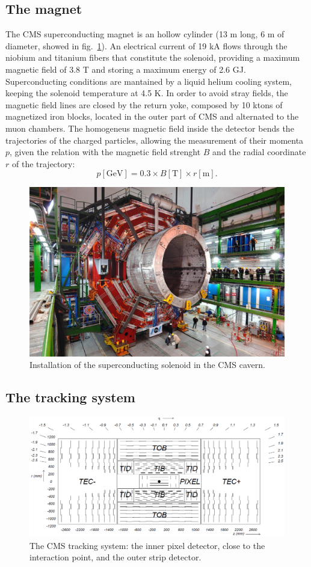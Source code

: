 \subsection{The magnet}
The CMS superconducting magnet is an hollow cylinder (13 m long, 6 m of diameter, showed in fig.~\ref{fig:CMS_solenoid}). An electrical current of 19 kA flows through the niobium and titanium fibers that constitute the solenoid, providing a maximum magnetic field of 3.8 T and storing a maximum energy of 2.6 GJ. Superconducting conditions are mantained by a liquid helium cooling system, keeping the solenoid temperature at 4.5 K. In order to avoid stray fields, the magnetic field lines are closed by the return yoke, composed by 10 ktons of magnetized iron blocks, located in the outer part of CMS and alternated to the muon chambers. The homogeneus magnetic field inside the detector bends the trajectories of the charged particles, allowing the measurement of their momenta $p$, given the relation with the magnetic field strenght $B$ and the radial coordinate $r$ of the trajectory:
\begin{equation}
p [\text{GeV}] = 0.3 \times B [\text{T}] \times r [\text{m}]. 
\end{equation}

\begin{figure}[!htb]
  \centering
    \includegraphics[width=.5\textwidth]{figures/CMS_solenoid.jpeg}
  \caption{Installation of the superconducting solenoid in the CMS cavern.}
  \label{fig:CMS_solenoid}
\end{figure}

\subsection{The tracking system}
\begin{figure}[!htb]
  \centering
    \includegraphics[width=.9\textwidth]{figures/cmstracker.png}
  \caption{The CMS tracking system: the inner pixel detector, close to the interaction point, and the outer strip detector.}
  \label{fig:CMS_tracker}
\end{figure}

